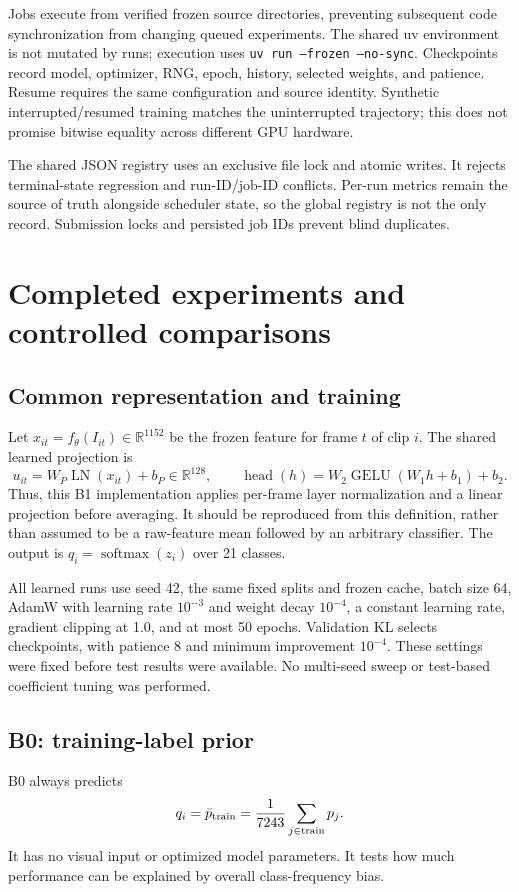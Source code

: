 \documentclass[11pt,a4paper]{article}
\newcommand{\softmax}{\operatorname{softmax}}
\newcommand{\LN}{\operatorname{LN}}
\newcommand{\GELU}{\operatorname{GELU}}
\newcommand{\code}[1]{\texttt{#1}}
\begin{document}
Jobs execute from verified frozen source directories, preventing subsequent code synchronization from changing queued experiments. The shared uv environment is not mutated by runs; execution uses \code{uv run --frozen --no-sync}. Checkpoints record model, optimizer, RNG, epoch, history, selected weights, and patience. Resume requires the same configuration and source identity. Synthetic interrupted/resumed training matches the uninterrupted trajectory; this does not promise bitwise equality across different GPU hardware.

The shared JSON registry uses an exclusive file lock and atomic writes. It rejects terminal-state regression and run-ID/job-ID conflicts. Per-run metrics remain the source of truth alongside scheduler state, so the global registry is not the only record. Submission locks and persisted job IDs prevent blind duplicates.

\section{Completed experiments and controlled comparisons}
\subsection{Common representation and training}
Let $x_{it}=f_\theta(I_{it})\in\mathbb{R}^{1152}$ be the frozen feature for frame $t$ of clip $i$. The shared learned projection is
\begin{equation}
u_{it}=W_P\LN(x_{it})+b_P\in\mathbb{R}^{128},\qquad
\operatorname{head}(h)=W_2\GELU(W_1h+b_1)+b_2.
\end{equation}
Thus, this B1 implementation applies per-frame layer normalization and a linear projection before averaging. It should be reproduced from this definition, rather than assumed to be a raw-feature mean followed by an arbitrary classifier. The output is $q_i=\softmax(z_i)$ over 21 classes.

All learned runs use seed 42, the same fixed splits and frozen cache, batch size 64, AdamW with learning rate $10^{-3}$ and weight decay $10^{-4}$, a constant learning rate, gradient clipping at 1.0, and at most 50 epochs. Validation KL selects checkpoints, with patience 8 and minimum improvement $10^{-4}$. These settings were fixed before test results were available. No multi-seed sweep or test-based coefficient tuning was performed.

\subsection{B0: training-label prior}
B0 always predicts
\begin{equation}
q_i=\bar p_{\rm train}=\frac{1}{7243}\sum_{j\in\mathrm{train}}p_j.
\end{equation}
It has no visual input or optimized model parameters. It tests how much performance can be explained by overall class-frequency bias.
\end{document}
